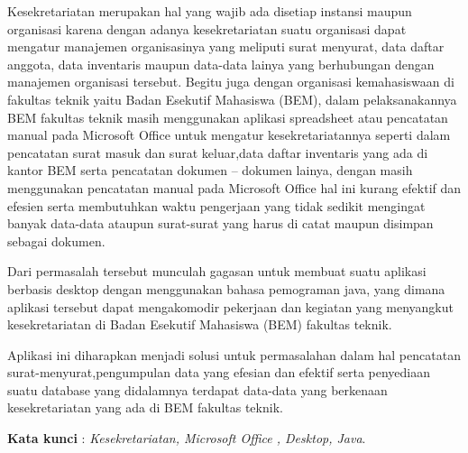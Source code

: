 \documentclass{jtetiproposalskripsi}
\begin{document}
\cover

\approvalpage


\begin{abstractind}
Kesekretariatan merupakan hal yang wajib ada disetiap instansi maupun organisasi karena dengan adanya kesekretariatan suatu organisasi dapat mengatur manajemen organisasinya yang meliputi surat menyurat, data daftar anggota,  data inventaris maupun data-data lainya yang berhubungan dengan manajemen organisasi tersebut. Begitu juga dengan organisasi kemahasiswaan di fakultas teknik yaitu Badan Esekutif Mahasiswa (BEM), dalam pelaksanakannya BEM fakultas teknik masih menggunakan aplikasi spreadsheet atau pencatatan manual pada Microsoft Office  untuk mengatur kesekretariatannya seperti dalam pencatatan surat masuk dan surat keluar,data daftar inventaris yang ada di kantor BEM serta pencatatan dokumen – dokumen lainya, dengan masih menggunakan pencatatan manual pada Microsoft Office  hal ini kurang efektif dan efesien serta membutuhkan waktu pengerjaan yang tidak sedikit mengingat banyak data-data ataupun surat-surat yang harus di catat maupun disimpan sebagai dokumen.

Dari permasalah tersebut munculah gagasan untuk membuat suatu aplikasi berbasis desktop dengan menggunakan bahasa pemograman java, yang dimana aplikasi tersebut dapat mengakomodir pekerjaan dan kegiatan yang menyangkut  kesekretariatan di Badan Esekutif Mahasiswa (BEM) fakultas teknik. 

Aplikasi ini diharapkan menjadi solusi untuk permasalahan dalam hal pencatatan surat-menyurat,pengumpulan data  yang efesian dan efektif serta penyediaan suatu database yang didalamnya terdapat data-data yang berkenaan kesekretariatan yang ada di BEM fakultas teknik.


\bigskip
\textbf{Kata kunci} : \emph{Kesekretariatan, Microsoft Office , Desktop, Java}.
\end{abstractind}

\tableofcontents
{}
\clearpage{}\setcounter{page}{1}
\end{document}
